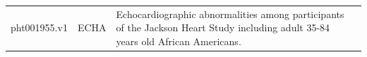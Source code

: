 \documentclass[11pt]{article}
\begin{document}
\begin{tabular}{r|lll}
	 pht001955.v1                                                                                                                                                                                                                                                                                                                                                                                                                                                                                                                                                                                                                                                                                                                                                                                                                                                                                                                                                                                  & ECHA                                                                                                                                                                                                                                                                                                                                                                                                                                                                                                                                                                                                                                                                                                                                                                                                                                                                                                                                                                                          & Echocardiographic abnormalities among participants of the Jackson Heart Study including adult 35-84 years old African Americans.                                                                                                                                                                                                                                                                                                                                                                                                                                                                                                                                                                                                                                                                                                                                                                                                                                                             \\

\end{tabular}
\end{document}
